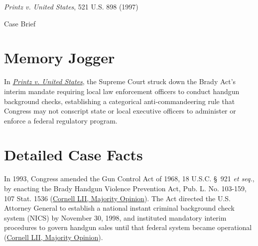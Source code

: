 \documentclass[12pt]{article}
\begin{document}
\begin{center}
{\LARGE \textit{Printz v. United States}, 521 U.S. 898 (1997)\par}
\vspace{0.8em}
{\large Case Brief\par}
\end{center}
\vspace{1em}

\section{Memory Jogger}
In \href{https://www.courtlistener.com/opinion/118148/printz-v-united-states/}{\textit{Printz v. United States}}, the Supreme Court struck down the Brady Act's interim mandate requiring local law enforcement officers to conduct handgun background checks, establishing a categorical anti-commandeering rule that Congress may not conscript state or local executive officers to administer or enforce a federal regulatory program.

\section{Detailed Case Facts}
In 1993, Congress amended the Gun Control Act of 1968, 18 U.S.C. \S\ 921 \textit{et seq.}, by enacting the Brady Handgun Violence Prevention Act, Pub. L. No. 103-159, 107 Stat. 1536 (\href{https://www.law.cornell.edu/supct/html/95-1478.ZO.html}{Cornell LII, Majority Opinion}). The Act directed the U.S. Attorney General to establish a national instant criminal background check system (NICS) by November 30, 1998, and instituted mandatory interim procedures to govern handgun sales until that federal system became operational (\href{https://www.law.cornell.edu/supct/html/95-1478.ZO.html}{Cornell LII, Majority Opinion}).
\end{document}

